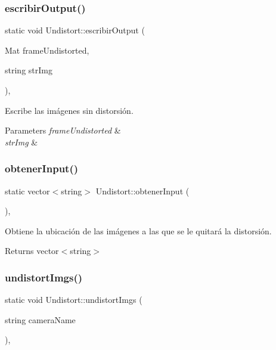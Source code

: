 \subsubsection{\texorpdfstring{escribir\+Output()}{escribirOutput()}}
{\footnotesize\ttfamily static void Undistort\+::escribir\+Output (\begin{DoxyParamCaption}\item[{Mat}]{frame\+Undistorted,  }\item[{string}]{str\+Img }\end{DoxyParamCaption})\hspace{0.3cm}{\ttfamily [inline]}, {\ttfamily [static]}}



Escribe las imágenes sin distorsión. 


\begin{DoxyParams}{Parameters}
{\em frame\+Undistorted} & \\
\hline
{\em str\+Img} & \\
\hline
\end{DoxyParams}
\mbox{\label{classUndistort_a72d7d2e5eae6b78c822a11feb5231644}} 
\subsubsection{\texorpdfstring{obtener\+Input()}{obtenerInput()}}
{\footnotesize\ttfamily static vector$<$string$>$ Undistort\+::obtener\+Input (\begin{DoxyParamCaption}{ }\end{DoxyParamCaption})\hspace{0.3cm}{\ttfamily [inline]}, {\ttfamily [static]}}



Obtiene la ubicación de las imágenes a las que se le quitará la distorsión. 

\begin{DoxyReturn}{Returns}
vector$<$string$>$ 
\end{DoxyReturn}
\mbox{\label{classUndistort_a1082f78a003fca5fca34a8181796561f}} 
\subsubsection{\texorpdfstring{undistort\+Imgs()}{undistortImgs()}}
{\footnotesize\ttfamily static void Undistort\+::undistort\+Imgs (\begin{DoxyParamCaption}\item[{string}]{camera\+Name }\end{DoxyParamCaption})\hspace{0.3cm}{\ttfamily [inline]}, {\ttfamily [static]}}



